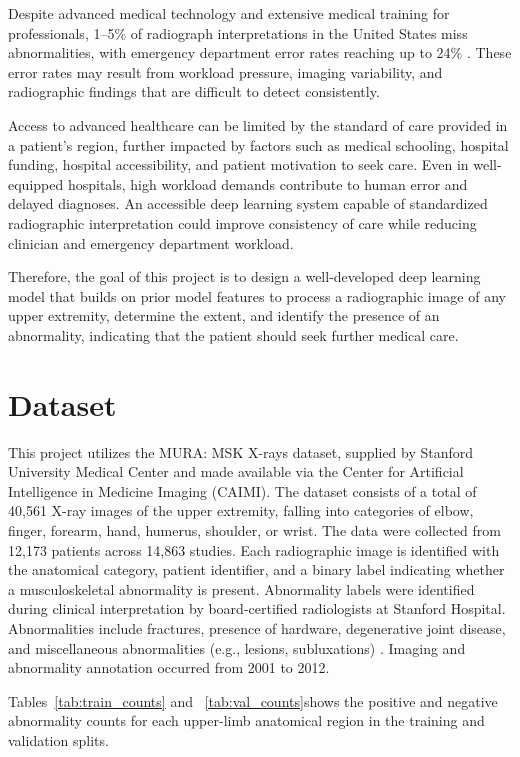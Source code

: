 \documentclass[conference]{IEEEtran}
\begin{document}
Despite advanced medical technology and extensive medical training for professionals, 1--5\% of radiograph interpretations in the United States miss abnormalities, with emergency department error rates reaching up to 24\% \cite{ref1,ref2,ref3}. These error rates may result from workload pressure, imaging variability, and radiographic findings that are difficult to detect consistently.

Access to advanced healthcare can be limited by the standard of care provided in a patient's region, further impacted by factors such as medical schooling, hospital funding, hospital accessibility, and patient motivation to seek care. Even in well-equipped hospitals, high workload demands contribute to human error and delayed diagnoses. An accessible deep learning system capable of standardized radiographic interpretation could improve consistency of care while reducing clinician and emergency department workload.

Therefore, the goal of this project is to design a well-developed deep learning model that builds on prior model features to process a radiographic image of any upper extremity, determine the extent, and identify the presence of an abnormality, indicating that the patient should seek further medical care.

\section{Dataset}
This project utilizes the MURA: MSK X-rays dataset, supplied by Stanford University Medical Center and made available via the Center for Artificial Intelligence in Medicine Imaging (CAIMI). The dataset consists of a total of 40,561 X-ray images of the upper extremity, falling into categories of elbow, finger, forearm, hand, humerus, shoulder, or wrist. The data were collected from 12,173 patients across 14,863 studies. Each radiographic image is identified with the anatomical category, patient identifier, and a binary label indicating whether a musculoskeletal abnormality is present. Abnormality labels were identified during clinical interpretation by board-certified radiologists at Stanford Hospital. Abnormalities include fractures, presence of hardware, degenerative joint disease, and miscellaneous abnormalities (e.g., lesions, subluxations) \cite{ref6}. Imaging and abnormality annotation occurred from 2001 to 2012.

Tables~\ref{tab:train_counts} and ~\ref{tab:val_counts}shows the positive and negative abnormality counts for each upper-limb anatomical region in the training and validation splits.
\end{document}
